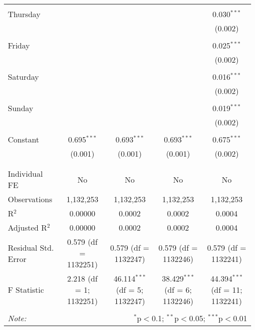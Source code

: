\documentclass[
]{article}
\begin{document}
\begin{table}[!htbp]
{\begin{tabular}{@{\extracolsep{5pt}}lcccc}
  & & & & \\ 
 Thursday &  &  &  & 0.030$^{***}$ \\ 
  &  &  &  & (0.002) \\ 
  & & & & \\ 
 Friday &  &  &  & 0.025$^{***}$ \\ 
  &  &  &  & (0.002) \\ 
  & & & & \\ 
 Saturday &  &  &  & 0.016$^{***}$ \\ 
  &  &  &  & (0.002) \\ 
  & & & & \\ 
 Sunday &  &  &  & 0.019$^{***}$ \\ 
  &  &  &  & (0.002) \\ 
  & & & & \\ 
 Constant & 0.695$^{***}$ & 0.693$^{***}$ & 0.693$^{***}$ & 0.675$^{***}$ \\ 
  & (0.001) & (0.001) & (0.001) & (0.002) \\ 
  & & & & \\ 
\hline \\[-1.8ex] 
Individual FE & No & No & No & No \\ 
Observations & 1,132,253 & 1,132,253 & 1,132,253 & 1,132,253 \\ 
R$^{2}$ & 0.00000 & 0.0002 & 0.0002 & 0.0004 \\ 
Adjusted R$^{2}$ & 0.00000 & 0.0002 & 0.0002 & 0.0004 \\ 
Residual Std. Error & 0.579 (df = 1132251) & 0.579 (df = 1132247) & 0.579 (df = 1132246) & 0.579 (df = 1132241) \\ 
F Statistic & 2.218 (df = 1; 1132251) & 46.114$^{***}$ (df = 5; 1132247) & 38.429$^{***}$ (df = 6; 1132246) & 44.394$^{***}$ (df = 11; 1132241) \\ 
\hline 
\hline \\[-1.8ex] 
\textit{Note:}  & \multicolumn{4}{r}{$^{*}$p$<$0.1; $^{**}$p$<$0.05; $^{***}$p$<$0.01} \\ 
\end{tabular}
} 
\end{table} 
\newpage
\end{document}
